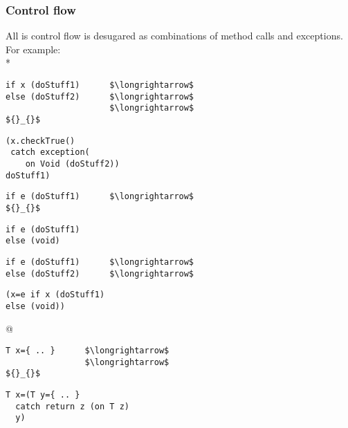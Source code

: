 \begin{frame}[fragile]
\frametitle{Control flow}
All is control flow is desugared as combinations of 
method calls and exceptions.
For example: \Q@if@
\\*
\begin{NiceCode}{26ex}{0.8}
\begin{lstlisting}
if x (doStuff1)      $\longrightarrow$
else (doStuff2)      $\longrightarrow$
                     $\longrightarrow$
${}_{}$
\end{lstlisting}
\end{NiceCode}
\begin{NiceCode}{26ex}{0.8}
\begin{lstlisting}
(x.checkTrue()
 catch exception(
    on Void (doStuff2))
doStuff1)  
\end{lstlisting}
\end{NiceCode}

\begin{NiceCode}{26ex}{0.8}
\begin{lstlisting}
if e (doStuff1)      $\longrightarrow$
${}_{}$
\end{lstlisting}
\end{NiceCode}
\begin{NiceCode}{26ex}{0.8}
\begin{lstlisting}
if e (doStuff1)
else (void)
\end{lstlisting}
\end{NiceCode}

\begin{NiceCode}{26ex}{0.8}
\begin{lstlisting}
if e (doStuff1)      $\longrightarrow$
else (doStuff2)      $\longrightarrow$
\end{lstlisting}
\end{NiceCode}
\begin{NiceCode}{26ex}{0.8}
\begin{lstlisting}
(x=e if x (doStuff1)
else (void))
\end{lstlisting}
\end{NiceCode}

@

\begin{NiceCode}{26ex}{0.8}
\begin{lstlisting}
T x={ .. }      $\longrightarrow$
                $\longrightarrow$
${}_{}$
\end{lstlisting}
\end{NiceCode}
\begin{NiceCode}{26ex}{0.8}
\begin{lstlisting}
T x=(T y={ .. } 
  catch return z (on T z)
  y)
\end{lstlisting}
\end{NiceCode}
\end{frame}

